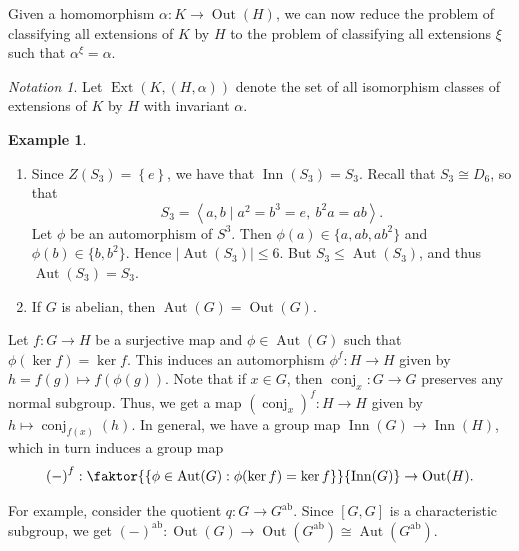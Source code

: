 \documentclass[10pt,letterpaper,cm]{nupset}
\theoremstyle{definition}
\newtheorem{exmp}[definition]{Example}
\theoremstyle{theorem}
\theoremstyle{remark}
\newtheorem*{notation}{Notation}
\newcommand{\1}{\mathbf{1}}
\newcommand{\0}{\vec 0}
\DeclareMathOperator{\aut}{Aut}
\DeclareMathOperator{\ext}{Ext}
\DeclareMathOperator{\inn}{Inn}
\DeclareMathOperator{\out}{Out}
\DeclareMathOperator{\ab}{ab}
\DeclareMathOperator{\conj}{conj}
\begin{document}
Given a homomorphism $\alpha: K \to \out(H)$, we can now reduce the problem of classifying all extensions of $K$ by $H$ to the problem of classifying all extensions $\xi$ such that $\alpha^{\xi} = \alpha$. 
\begin{notation}
Let $\ext(K, (H, \alpha))$ denote the set of all isomorphism classes of extensions of $K$ by $H$ with invariant $\alpha$.
\end{notation}

\begin{exmp} $ $
\begin{enumerate}
\item Since $Z(S_3) =\left\{e\right\}$, we have that $\inn(S_3) = S_3$. Recall that $S_3 \cong D_6$, so that $$S_3 = \left\langle a, b \mid a^2 = b^3 = e,\ b^2a = ab\right\rangle.$$ Let $\phi$ be an automorphism of $S^3$. Then $\phi(a) \in \{a, ab, ab^2\}$ and $\phi(b) \in \{b, b^2\}$. Hence $\left\lvert{\aut(S_3)}\right\rvert\leq 6$. But $S_3 \leq \aut(S_3)$, and thus $\aut(S_3) = S_3$.
\item If $G$ is abelian, then $\aut(G)= \out(G)$.
\end{enumerate}
\end{exmp}

\medskip

Let $f: G \to H$ be a surjective map and $\phi \in \aut(G)$ such that $\phi(\ker{f}) = \ker{f}$. This induces an automorphism $\phi^f : H \to H$ given by $h = f(g) \mapsto f(\phi(g))$.  Note that if $x\in G$, then $\conj_x: G \to G$ preserves any normal subgroup. Thus, we get a map $\left(\conj_x\right)^f : H \to H$ given by $h\mapsto \conj_{f(x)}(h)$. In general, we have a group map $\inn(G) \to \inn(H)$, which in turn induces a group map $$\left({-}\right)^f: \faktor{\left\{\phi \in \aut(G) : \phi(\ker{f})= \ker{f}\right\}}{\inn(G)} \to \out(H).$$

For example, consider the quotient $q : G \to G^{\ab}$. Since $[G, G]$ is a characteristic subgroup, we get $\left({-}\right)^{\ab} : \out(G) \to \out(G^{\ab})\cong \aut(G^{\ab})$.

\medskip
\end{document}
